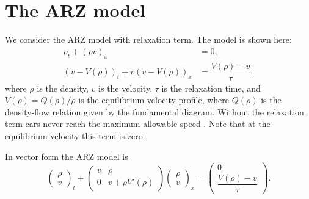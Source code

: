 \documentclass[preprint]{elsarticle}
\begin{document}
\section{The ARZ model} \label{ARZSection}


We consider the ARZ model with relaxation term. The model is shown here: 
\begin{align} 
\rho_t + (\rho v)_x &= 0, \label{ARZ1} \\
(v - V(\rho))_t + v(v - V(\rho))_x &=\dfrac{V(\rho) - v}{\tau} \label{ARZ2},
\end{align}
where $\rho$ is the density, $v$ is the velocity, $\tau$ is the relaxation time, and $V(\rho) = Q(\rho)/\rho$ is the equilibrium velocity profile, where $Q(\rho)$ is the density-flow relation given by the fundamental diagram. Without the relaxation term cars never reach the maximum allowable speed \cite{R_improved}. Note that at the equilibrium velocity this term is zero. 

In vector form the ARZ model is
\begin{equation} \label{ARZrhov}
\begin{pmatrix}
\rho \\ v
\end{pmatrix}_t
+ \begin{pmatrix}
v & \rho \\
0 & v + \rho V' (\rho)
\end{pmatrix}
\begin{pmatrix}
\rho \\ v
\end{pmatrix}_x = 
\begin{pmatrix}
0 \\ \dfrac{V(\rho) - v}{\tau}
\end{pmatrix}.
\end{equation}
\end{document}
